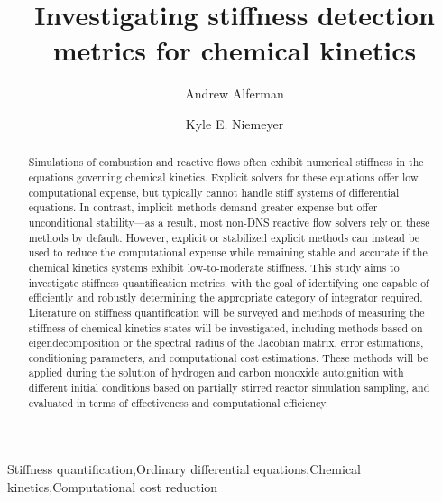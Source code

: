 \documentclass[12pt]{ussci}
\title{ Investigating stiffness detection metrics for chemical kinetics }
\author[1]{Andrew Alferman}
\author[1,*]{Kyle E. Niemeyer}
\affil[1]{School of Mechanical, Industrial, and Manufacturing Engineering\\
		Oregon State University, Corvallis, OR 97331, USA}
\affil[*]{Corresponding author: \email{Kyle.Niemeyer@oregonstate.edu}}
\begin{document}
\maketitle

\begin{abstract} %


Simulations of combustion and reactive flows often exhibit numerical stiffness in the equations governing chemical kinetics. Explicit solvers for these equations offer low computational expense, but typically cannot handle stiff systems of differential equations. In contrast, implicit methods demand greater expense but offer unconditional stability—as a result, most non-DNS reactive flow solvers rely on these methods by default. However, explicit or stabilized explicit methods can instead be used to reduce the computational expense while remaining stable and accurate if the chemical kinetics systems exhibit low-to-moderate stiffness. This study aims to investigate stiffness quantification metrics, with the goal of identifying one capable of efficiently and robustly determining the appropriate category of integrator required. Literature on stiffness quantification will be surveyed and methods of measuring the stiffness of chemical kinetics states will be investigated, including methods based on eigendecomposition or the spectral radius of the Jacobian matrix, error estimations, conditioning parameters, and computational cost estimations. These methods will be applied during the solution of hydrogen and carbon monoxide autoignition with different initial conditions based on partially stirred reactor simulation sampling, and evaluated in terms of effectiveness and computational efficiency.\

\end{abstract}

\begin{keyword}
    Stiffness quantification\sep Ordinary differential equations\sep Chemical kinetics\sep Computational cost reduction
\end{keyword}
\end{document}
